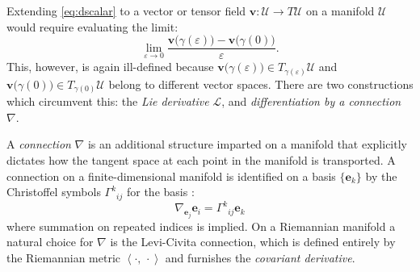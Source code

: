 Extending \eqref{eq:dscalar} to a vector or tensor field
\(\boldsymbol{v}: \mathcal{U}\rightarrow T\mathcal{U}\) on a manifold
\(\mathcal{U}\)
would require
evaluating the limit: 
\begin{equation*}
\lim _{\varepsilon \rightarrow 0} \frac{\boldsymbol{v} \bigl( \gamma(\varepsilon) \bigr) -\boldsymbol{v}\bigl(\gamma(0)\bigr) }{\varepsilon} .
\end{equation*}
This, however, is again ill-defined because
\(\boldsymbol{v} \bigl( \gamma(\varepsilon) \bigr) \in T_{\gamma(\varepsilon)} \mathcal{U}\)
and \(\boldsymbol{v}\bigl( \gamma(0) \bigr) \in T_{\gamma(0)} \mathcal{U}\) belong to
different vector spaces. There are two constructions which circumvent
this: the \emph{Lie derivative} \(\mathcal{L}\), and
\emph{differentiation by a connection} \(\nabla\).

A \emph{connection} \(\nabla\) is an additional structure imparted on a
manifold that explicitly dictates how the tangent space at each point in
the manifold is transported. A connection on a finite-dimensional manifold is identified on a basis
\(\{\mathbf{e}_k\}\) by the Christoffel symbols \(\Gamma^k{ }_{i j}\) for the basis 
\citep{abraham1994foundations, bishop1980tensor}: 
\begin{equation*}
\nabla_{\mathbf{e}_j} \mathbf{e}_i=\Gamma^k{ }_{i j} \mathbf{e}_k
\end{equation*}
where summation on repeated indices is implied. On a Riemannian
manifold a natural choice for \(\nabla\) is the Levi-Civita connection,
which is defined entirely by the Riemannian metric
\(\left<\cdot,\,\cdot\right>\) and furnishes the \emph{covariant
derivative}. 

